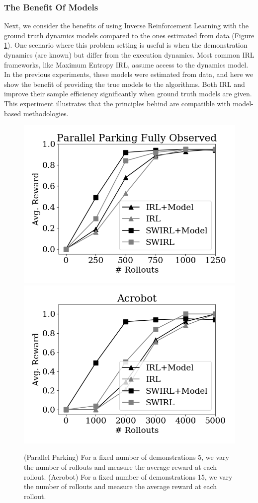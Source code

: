 \subsubsection{The Benefit Of Models}
Next, we consider the benefits of using Inverse Reinforcement Learning with the ground truth dynamics models compared to the ones estimated from data (Figure \ref{exp:mod}). One scenario where this problem setting is useful is when the demonstration dynamics (are known) but differ from the execution dynamics. Most common IRL frameworks, like Maximum Entropy IRL, assume access to the dynamics model. In the previous experiments, these models were estimated from data, and here we show the benefit of providing the true models to the algorithms. Both IRL and \hirl improve their sample efficiency significantly when ground truth models are given. This experiment illustrates that the principles behind \hirl are compatible with model-based methodologies.


\begin{figure}[ht!]
\centering
 \includegraphics[width=0.48\columnwidth]{swirl-experiments/ppfo-mod1.png}
 \includegraphics[width=0.48\columnwidth]{swirl-experiments/ppfo-mod2.png}
 \caption{(Parallel Parking) For a fixed number of demonstrations 5, we vary the number of rollouts and measure the average reward at each rollout.  (Acrobot) For a fixed number of demonstrations 15, we vary the number of rollouts and measure the average reward at each rollout. \label{exp:mod}}
\end{figure}


